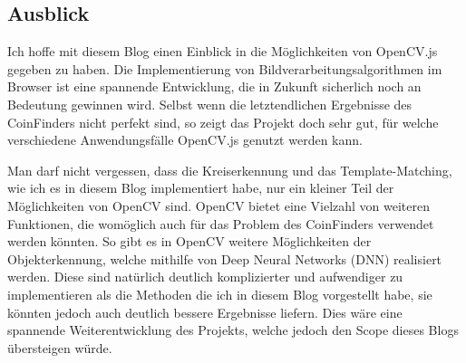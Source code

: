 \subsection{Ausblick}
Ich hoffe mit diesem Blog einen Einblick in die Möglichkeiten von OpenCV.js gegeben zu haben. Die Implementierung von Bildverarbeitungsalgorithmen im Browser ist eine spannende Entwicklung, die in Zukunft sicherlich noch an Bedeutung gewinnen wird. Selbst wenn die letztendlichen Ergebnisse des CoinFinders nicht perfekt sind, so zeigt das Projekt doch sehr gut, für welche verschiedene Anwendungsfälle OpenCV.js genutzt werden kann.

Man darf nicht vergessen, dass die Kreiserkennung und das Template-Matching, wie ich es in diesem Blog implementiert habe, nur ein kleiner Teil der Möglichkeiten von OpenCV sind. OpenCV bietet eine Vielzahl von weiteren Funktionen, die womöglich auch für das Problem des CoinFinders verwendet werden könnten. So gibt es in OpenCV weitere Möglichkeiten der Objekterkennung, welche mithilfe von Deep Neural Networks (DNN) realisiert werden. Diese sind natürlich deutlich komplizierter und aufwendiger zu implementieren als die Methoden die ich in diesem Blog vorgestellt habe, sie könnten jedoch auch deutlich bessere Ergebnisse liefern. Dies wäre eine spannende Weiterentwicklung des Projekts, welche jedoch den Scope dieses Blogs übersteigen würde. 
